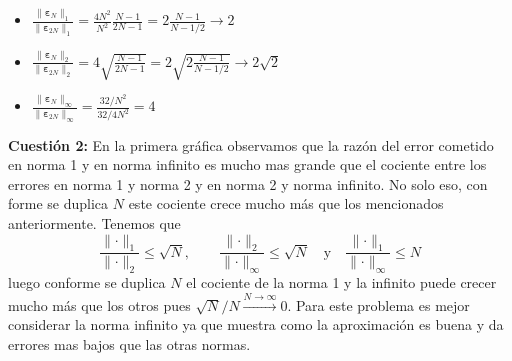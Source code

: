\documentclass[12pt]{article}
\newcommand{\norm}[1]{\lVert #1\rVert}
\theoremstyle{definition}
\begin{document}
\begin{itemize}
	\item $\displaystyle \frac{\norm{\bm{\varepsilon}_N}_1}{\norm{\bm{\varepsilon}_{2N}}_1} = \frac{4N^2}{N^2}\frac{N-1}{2N-1} = 2\frac{N-1}{N - 1/2} \longrightarrow 2$
	\item $\displaystyle \frac{\norm{\bm{\varepsilon}_N}_2}{\norm{\bm{\varepsilon}_{2N}}_2} = 4\sqrt{\frac{N-1}{2N-1}} = 2\sqrt{2 \frac{N-1}{N - 1/2}} \longrightarrow 2\sqrt{2}$
	\item $\displaystyle \frac{\norm{\bm{\varepsilon}_N}_\infty}{\norm{\bm{\varepsilon}_{2N}}_\infty} = \frac{32 / N^2}{32 / 4N^2} = 4$\\
	
\end{itemize}

\noindent\textbf{Cuestión 2:} En la primera gráfica observamos que la razón del error cometido en norma 1 y en norma infinito es mucho mas grande que el cociente entre los errores en norma 1 y norma 2 y en norma 2 y norma infinito. No solo eso, con forme se duplica $N$ este cociente crece mucho más que los mencionados anteriormente. Tenemos que 
$$\frac{\norm{\cdot}_1}{\norm{\cdot}_2} \leq \sqrt{N},\quad\quad \frac{\norm{\cdot}_2}{\norm{\cdot}_\infty} \leq \sqrt{N} \quad\text{y}\quad \frac{\norm{\cdot}_1}{\norm{\cdot}_\infty} \leq N $$
luego conforme se duplica $N$ el cociente de la norma 1 y la infinito puede crecer mucho más que los otros pues $\sqrt{N} / N \stackrel{N\to\infty}{\longrightarrow} 0$. Para este problema es mejor considerar la norma infinito ya que muestra como la aproximación es buena y da errores mas bajos que las otras normas. \\
\end{document}
